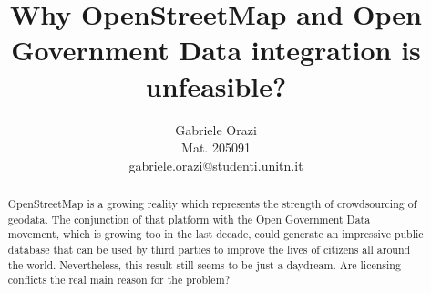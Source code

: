 \documentclass[runningheads,a4paper]{llncs}
\begin{document}
\mainmatter  %

\title{Why OpenStreetMap and Open Government Data integration is unfeasible?}


\author{Gabriele Orazi\\
Mat. 205091
\mailsa\\gabriele.orazi@studenti.unitn.it\\}


\maketitle

\begin{abstract}
OpenStreetMap is a growing reality which represents the strength of crowdsourcing of geodata. The conjunction of that platform with the Open Government Data movement, which is growing too in the last decade, could generate an impressive public database that can be used by third parties to improve the lives of citizens all around the world.
Nevertheless, this result still seems to be just a daydream. Are licensing conflicts the real main reason for the problem?
\end{abstract}







   

   

\newpage



\end{document}
